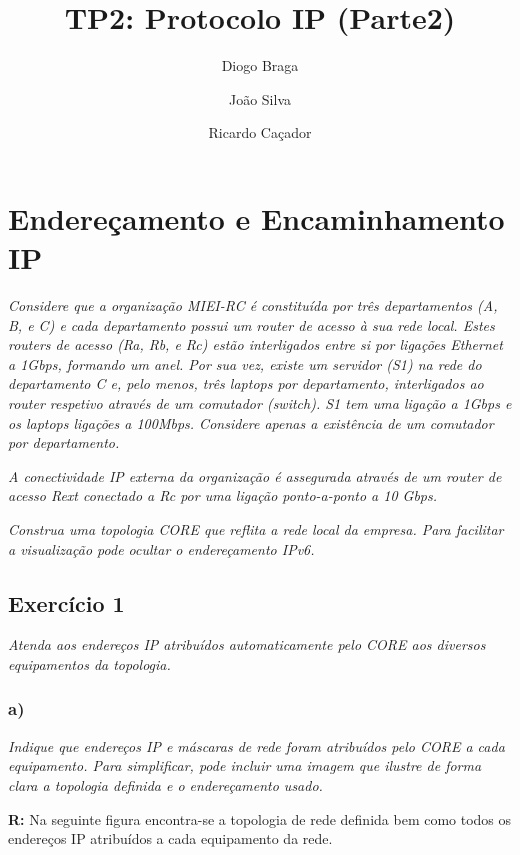 \documentclass{llncs}
\begin{document}
\mainmatter
\title{TP2: Protocolo IP (Parte2)}


\author{Diogo Braga \and João Silva \and Ricardo Caçador}



\date{}


\maketitle

\section{Endereçamento e Encaminhamento IP}
\emph{Considere que a organização MIEI-RC é constituída por três departamentos (A, B, e C) e cada departamento possui um router de acesso à sua rede local. Estes routers de acesso (Ra, Rb, e Rc) estão interligados entre si por ligações Ethernet a 1Gbps, formando um anel. Por sua vez, existe um servidor (S1) na rede do departamento C e, pelo menos, três laptops por departamento, interligados ao router respetivo através de um comutador (switch). S1 tem uma ligação a 1Gbps e os laptops ligações a 100Mbps. Considere apenas a existência de um comutador por departamento.}

\emph{A conectividade IP externa da organização é assegurada através de um router de acesso Rext conectado a Rc por uma ligação ponto-a-ponto a 10 Gbps.}

\emph{Construa  uma  topologia  CORE que reflita a rede local da  empresa. Para  facilitar  a visualização pode ocultar o endereçamento IPv6.}

\subsection{Exercício 1}
\emph{Atenda aos endereços IP atribuídos automaticamente pelo CORE aos diversos equipamentos da topologia.}

\subsubsection{a)}
\emph{Indique que endereços IP e máscaras de rede foram atribuídos pelo CORE a cada equipamento. Para simplificar, pode incluir uma imagem que ilustre de forma clara a topologia definida e o endereçamento usado.}
\\ \par
\textbf{R:} Na seguinte figura encontra-se a topologia de rede definida bem como todos os endereços IP atribuídos a cada equipamento da rede.
\end{document}
